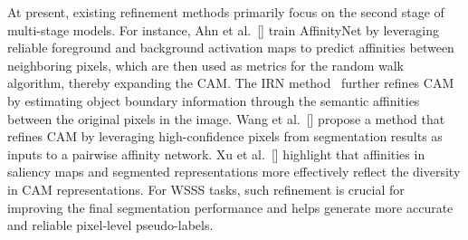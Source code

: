      At present, existing refinement methods primarily focus on the second stage of multi-stage models. For instance, Ahn et al.~[\citeyear{ahn2018learning}] train AffinityNet by leveraging reliable foreground and background activation maps to predict affinities between neighboring pixels, which are then used as metrics for the random walk algorithm, thereby expanding the CAM. The IRN method~\cite{ahn2019weakly} further refines CAM by estimating object boundary information through the semantic affinities between the original pixels in the image. Wang et al.~[\citeyear{wang2020weakly}] propose a method that refines CAM by leveraging high-confidence pixels from segmentation results as inputs to a pairwise affinity network. Xu et al.~[\citeyear{xu2021leveraging}] highlight that affinities in saliency maps and segmented representations more effectively reflect the diversity in CAM representations. For WSSS tasks, such refinement is crucial for improving the final segmentation performance and helps generate more accurate and reliable pixel-level pseudo-labels.